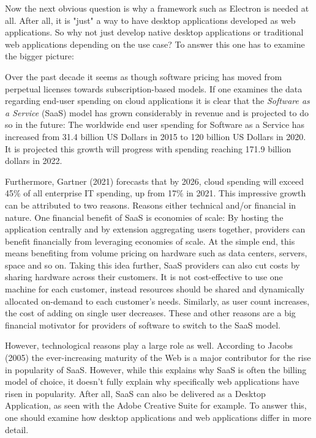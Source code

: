 Now the next obvious question is why a framework such as Electron is needed at all.
After all, it is "just" a way to have desktop applications developed as web applications.
So why not just develop native desktop applications or traditional web applications depending on the use case?
To answer this one has to examine the bigger picture:\par
Over the past decade it seems as though software pricing has moved from perpetual licenses towards subscription-based
models.
If one examines the data regarding end-user spending on cloud applications it is clear that the
\emph{Software as a Service} (SaaS) model has grown considerably in revenue and is projected to do so in the future:
The worldwide end user spending for Software as a Service has increased from 31.4 billion US Dollars in 2015 to 120
billion US Dollars in 2020.
It is projected this growth will progress with spending reaching 171.9 billion dollars in 2022.\cite{gartner2021}\par
Furthermore, Gartner (2021) forecasts that by 2026, cloud spending will exceed 45\% of all enterprise IT spending, up from
17\% in 2021.
This impressive growth can be attributed to two reasons.
Reasons either technical and/or financial in nature.
One financial benefit of SaaS is economies of scale:
By hosting the application centrally and by extension aggregating users together, providers can benefit financially from
leveraging economies of scale.
At the simple end, this means benefiting from volume pricing on hardware such as data centers, servers, space and so on.
Taking this idea further, SaaS providers can also cut costs by sharing hardware across their customers.
It is not cost-effective to use one machine for each customer, instead resources should be shared and dynamically
allocated on-demand to each customer's needs.
Similarly, as user count increases, the cost of adding on single user decreases.
These and other reasons are a big financial motivator for providers of software to switch to the SaaS model.\par
However, technological reasons play a large role as well.
According to Jacobs (2005) the ever-increasing maturity of the Web is a major contributor for the rise in popularity of
SaaS\@.
However, while this explains why SaaS is often the billing model of choice, it doesn't fully explain why specifically web applications
have risen in popularity.\cite{statista2021}
After all, SaaS can also be delivered as a Desktop Application, as seen with the Adobe Creative Suite for example. 
To answer this, one should examine how desktop applications and web applications differ in more detail.

